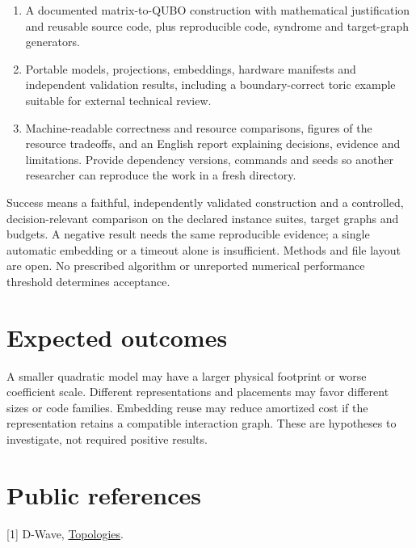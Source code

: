 \documentclass[11pt,letterpaper]{article}
\begin{document}
\begin{enumerate}\item A documented matrix-to-QUBO construction with mathematical justification and reusable source code, plus reproducible code, syndrome and target-graph generators.
\item Portable models, projections, embeddings, hardware manifests and independent validation results, including a boundary-correct toric example suitable for external technical review.
\item Machine-readable correctness and resource comparisons, figures of the resource tradeoffs, and an English report explaining decisions, evidence and limitations. Provide dependency versions, commands and seeds so another researcher can reproduce the work in a fresh directory.\end{enumerate}

Success means a faithful, independently validated construction and a controlled, decision-relevant comparison on the declared instance suites, target graphs and budgets. A negative result needs the same reproducible evidence; a single automatic embedding or a timeout alone is insufficient. Methods and file layout are open. No prescribed algorithm or unreported numerical performance threshold determines acceptance.\par

\section{Expected outcomes}

A smaller quadratic model may have a larger physical footprint or worse coefficient scale. Different representations and placements may favor different sizes or code families. Embedding reuse may reduce amortized cost if the representation retains a compatible interaction graph. These are hypotheses to investigate, not required positive results.\par

\clearpage

\section{Public references}

{\small [1] D-Wave, \href{https://docs.dwavequantum.com/en/latest/quantum_research/topologies.html}{Topologies}.\par}\vspace{5pt}
\end{document}
